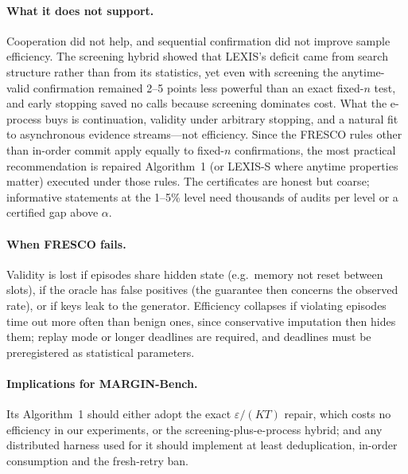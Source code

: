 \documentclass[11pt]{article}
\theoremstyle{definition}
\theoremstyle{remark}
\begin{document}
\paragraph{What it does not support.} Cooperation did not help, and sequential confirmation did not improve sample efficiency. The screening hybrid showed that LEXIS's deficit came from search structure rather than from its statistics, yet even with screening the anytime-valid confirmation remained 2--5 points less powerful than an exact fixed-$n$ test, and early stopping saved no calls because screening dominates cost. What the e-process buys is continuation, validity under arbitrary stopping, and a natural fit to asynchronous evidence streams---not efficiency. Since the FRESCO rules other than in-order commit apply equally to fixed-$n$ confirmations, the most practical recommendation is repaired Algorithm~1 (or LEXIS-S where anytime properties matter) executed under those rules. The certificates are honest but coarse; informative statements at the 1--5\% level need thousands of audits per level or a certified gap above $\alpha$.

\paragraph{When FRESCO fails.} Validity is lost if episodes share hidden state (e.g.\ memory not reset between slots), if the oracle has false positives (the guarantee then concerns the observed rate), or if keys leak to the generator. Efficiency collapses if violating episodes time out more often than benign ones, since conservative imputation then hides them; replay mode or longer deadlines are required, and deadlines must be preregistered as statistical parameters.

\paragraph{Implications for MARGIN-Bench.} Its Algorithm~1 should either adopt the exact $\varepsilon/(KT)$ repair, which costs no efficiency in our experiments, or the screening-plus-e-process hybrid; and any distributed harness used for it should implement at least deduplication, in-order consumption and the fresh-retry ban.

\end{document}
